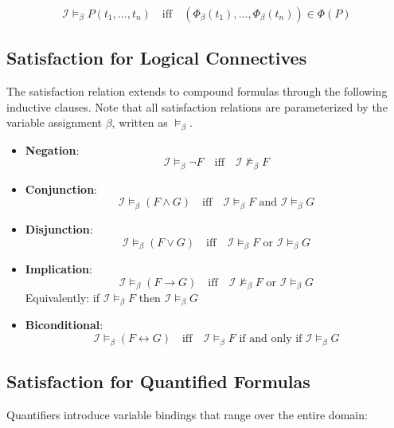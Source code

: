 \documentclass[11pt,a4paper]{article}
\theoremstyle{definition}
\theoremstyle{plain}
\theoremstyle{remark}
\begin{document}
\[
\mathcal{I} \models_\beta P(t_1, \dots, t_n) \quad \text{iff} \quad (\Phi_\beta(t_1), \dots, \Phi_\beta(t_n)) \in \Phi(P)
\]

\subsection{Satisfaction for Logical Connectives}

The satisfaction relation extends to compound formulas through the following inductive clauses. Note that all satisfaction relations are parameterized by the variable assignment $\beta$, written as $\models_\beta$.

\begin{itemize}
    \item \textbf{Negation}: 
    \[
    \mathcal{I} \models_\beta \neg F \quad \text{iff} \quad \mathcal{I} \not\models_\beta F
    \]
    
    \item \textbf{Conjunction}: 
    \[
    \mathcal{I} \models_\beta (F \wedge G) \quad \text{iff} \quad \mathcal{I} \models_\beta F \text{ and } \mathcal{I} \models_\beta G
    \]
    
    \item \textbf{Disjunction}: 
    \[
    \mathcal{I} \models_\beta (F \vee G) \quad \text{iff} \quad \mathcal{I} \models_\beta F \text{ or } \mathcal{I} \models_\beta G
    \]
    
    \item \textbf{Implication}: 
    \[
    \mathcal{I} \models_\beta (F \rightarrow G) \quad \text{iff} \quad \mathcal{I} \not\models_\beta F \text{ or } \mathcal{I} \models_\beta G
    \]
    Equivalently: if $\mathcal{I} \models_\beta F$ then $\mathcal{I} \models_\beta G$
    
    \item \textbf{Biconditional}: 
    \[
    \mathcal{I} \models_\beta (F \leftrightarrow G) \quad \text{iff} \quad \mathcal{I} \models_\beta F \text{ if and only if } \mathcal{I} \models_\beta G
    \]
\end{itemize}

\subsection{Satisfaction for Quantified Formulas}

Quantifiers introduce variable bindings that range over the entire domain:
\end{document}
